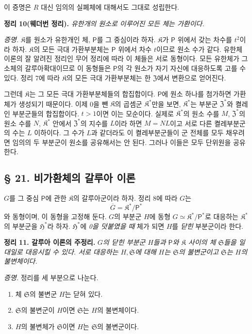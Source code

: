 이 증명은 \(R\) 대신 임의의 실폐체에 대해서도 그대로 성립한다.

\textbf{정리 10(웨더번 정리).} \emph{유한개의 원소로 이루어진 모든 체는 가환이다.}

\emph{증명.} \(\mathfrak K\)를 원소가 유한개인 체, \(\mathsf P\)를 그 중심이라 하자. \(\mathfrak K\)가 \(\mathsf P\) 위에서 갖는 차수를 \(t^2\)이라 하자. \(\mathfrak K\)의 모든 극대 가환부분체는 \(\mathsf P\) 위에서 차수 \(t\)이므로 원소 수가 같다. 유한체 이론의 잘 알려진 정리인 무어 정리에 따라 이 체들은 서로 동형이다. 모든 유한체가 그 소체의 갈루아확대이므로 이 동형들은 \(\mathsf P\)의 각 원소가 자기 자신에 대응하도록 고를 수 있다. 정리 7에 따라 \(\mathfrak K\)의 모든 극대 가환부분체는 한 \(\mathfrak Z\)에서 변환으로 얻어진다.

그런데 \(\mathfrak K\)는 그 모든 극대 가환부분체들의 합집합이다. \(\mathsf P\)에 원소 하나를 첨가하면 가환체가 생성되기 때문이다. 이제 0을 뺀 \(\mathfrak K\)의 곱셈군 \(\mathfrak K^*\)만을 보면, \(\mathfrak K^*\)는 부분군 \(\mathfrak Z^*\)와 켤레인 부분군들의 합집합이다. \(t>1\)이면 이는 모순이다. 실제로 \(\mathfrak K^*\)의 원소 수를 \(M\), \(\mathfrak Z^*\)의 원소 수를 \(N\), \(\mathfrak K^*\) 안에서 \(\mathfrak Z^*\)의 지수를 \(L\)이라 하면 \(M=NL\)이고 서로 다른 켤레부분군의 수는 \(L\) 이하이다. 그 수가 \(L\)과 같더라도 이 켤레부분군들이 군 전체를 모두 채우려면 임의의 두 부분군이 원소를 공유해서는 안 된다. 그러나 이들은 모두 단위원을 공유한다.

\subsection*{§ 21. 비가환체의 갈루아 이론}

\(G\)를 그 중심 \(\mathsf P\)에 관한 \(\mathfrak K\)의 갈루아군이라 하자. 정리 8에 따라 \(G\)는
\[
        \overline G=\mathfrak K^*/\mathsf P^*
\]
와 동형이며, 이 동형을 고정해 둔다. \(G\)의 부분군 \(H\)에 동형 \(G\simeq\mathfrak K^*/\mathsf P^*\)로 대응하는 \(\mathfrak K^*\)의 부분군을 \(\mathfrak H^*\)라 하자. \(\mathfrak H^*\)에 \emph{0을 덧붙였을 때} 체가 되면 \(H\)를 \emph{닫힌} 부분군이라 한다.

\textbf{정리 11. 갈루아 이론의 주정리.} \emph{\(G\)의 닫힌 부분군 \(H\)들과 \(\mathsf P\)와 \(\mathfrak K\) 사이의 체 \(\mathfrak S\)들을 일대일로 대응시킬 수 있다. 서로 대응하는 \(H,\mathfrak S\)에 대해 \(H\)는 \(\mathfrak S\)의 불변군이고 \(\mathfrak S\)는 \(H\)의 불변체이다.}

\emph{증명.} 정리를 세 부분으로 나눈다.

\begin{enumerate}
\item 체 \(\mathfrak S\)의 불변군 \(H\)는 닫혀 있다.
\item \(\mathfrak S\)의 불변군이 \(H\)이면 \(\mathfrak S\)는 \(H\)의 불변체이다.
\item \(H\)의 불변체가 \(\mathfrak S\)이면 \(H\)는 \(\mathfrak S\)의 불변군이다.
\end{enumerate}

